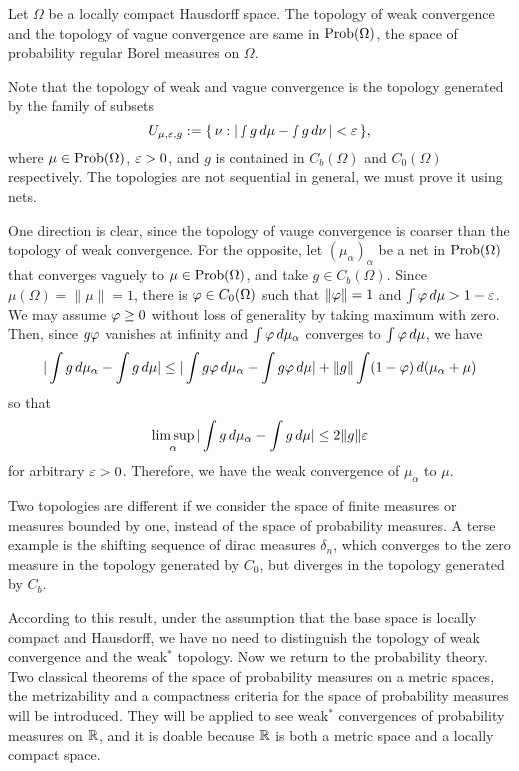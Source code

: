 \documentclass[a4paper]{article}
\begin{document}
\begin{thm}
Let $\Omega$ be a locally compact Hausdorff space.
The topology of weak convergence and the topology of vague convergence are same in $\operatorname{Prob}(\Omega)$, the space of probability regular Borel measures on $\Omega$.
\end{thm}

Note that the topology of weak and vague convergence is the topology generated by the family of subsets
\[U_{\mu,\varepsilon,g}:=\{\,\nu:|\smallint g\,d\mu-\smallint g\,d\nu\,|<\varepsilon\,\},\]
where $\mu\in\operatorname{Prob}(\Omega)$, $\varepsilon>0$, and $g$ is contained in $C_b(\Omega)$ and $C_0(\Omega)$ respectively.
The topologies are not sequential in general, we must prove it using nets.

\begin{pf}
One direction is clear, since the topology of vauge convergence is coarser than the topology of weak convergence.
For the opposite, let $(\mu_\alpha)_\alpha$ be a net in $\operatorname{Prob}(\Omega)$ that converges vaguely to $\mu\in\operatorname{Prob}(\Omega)$, and take $g\in C_b(\Omega)$.
Since $\mu(\Omega)=\|\mu\|=1$, there is $\varphi\in C_0(\Omega)$ such that $\|\varphi\|=1$ and $\int\varphi\,d\mu>1-\varepsilon$.
We may assume $\varphi\ge0$ without loss of generality by taking maximum with zero.
Then, since $g\varphi$ vanishes at infinity and $\int\varphi\,d\mu_\alpha$ converges to $\int\varphi\,d\mu$, we have
\[|\int g\,d\mu_\alpha-\int g\,d\mu|\le|\int g\varphi\,d\mu_\alpha-\int g\varphi\,d\mu|+\|g\|\int(1-\varphi)\,d(\mu_\alpha+\mu)\]
so that
\[\limsup_\alpha|\int g\,d\mu_\alpha-\int g\,d\mu|\le2\|g\|\varepsilon\]
for arbitrary $\varepsilon>0$.
Therefore, we have the weak convergence of $\mu_\alpha$ to $\mu$.
\end{pf}
\begin{ex}
Two topologies are different if we consider the space of finite measures or measures bounded by one, instead of the space of probability measures.
A terse example is the shifting sequence of dirac measures $\delta_n$, which converges to the zero measure in the topology generated by $C_0$, but diverges in the topology generated by $C_b$.
\end{ex}

According to this result, under the assumption that the base space is locally compact and Hausdorff, we have no need to distinguish the topology of weak convergence and the weak$^*$ topology.
Now we return to the probability theory.
Two classical theorems of the space of probability measures on a metric spaces, the metrizability and a compactness criteria for the space of probability measures will be introduced.
They will be applied to see weak$^*$ convergences of probability measures on $\mathbb{R}$, and it is doable because $\mathbb{R}$ is both a metric space and a locally compact space.
\end{document}
